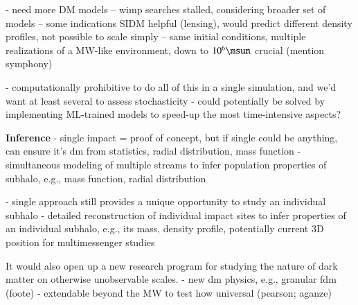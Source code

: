 \documentclass[final,5p,times,twocolumn,authoryear]{elsarticle}
\begin{document}
- need more DM models
-- wimp searches stalled, considering broader set of models
-- some indications SIDM helpful (lensing), would predict different density profiles, not possible to scale simply
-- same initial conditions, multiple realizations of a MW-like environment, down to $10^6\unit{\msun}$ crucial (mention symphony)

- computationally prohibitive to do all of this in a single simulation, and we'd want at least several to assess stochasticity
- could potentially be solved by implementing ML-trained models to speed-up the most time-intensive aspects?


\textbf{Inference}
- single impact = proof of concept, but if single could be anything, can ensure it's dm from statistics, radial distribution, mass function
- simultaneous modeling of multiple streams to infer population properties of subhalo, e.g., mass function, radial distribution

- single approach still provides a unique opportunity to study an individual subhalo
- detailed reconstruction of individual impact sites to infer properties of an individual subhalo, e.g., its mass, density profile, potentially current 3D position for multimessenger studies



It would also open up a new research program for studying the nature of dark matter on otherwise unobservable scales.
- new dm physics, e.g., granular fdm (foote)
- extendable beyond the MW to test how universal (pearson; aganze)

\appendix
\end{document}
